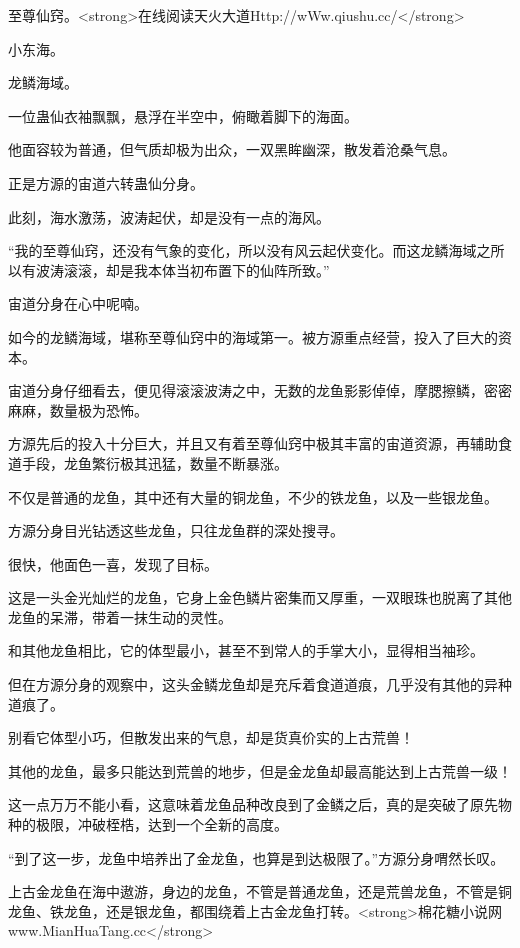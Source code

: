 
\begin{this_body}

至尊仙窍。<strong>在线阅读天火大道Http://wWw.qiushu.cc/</strong>

小东海。

龙鳞海域。

一位蛊仙衣袖飘飘，悬浮在半空中，俯瞰着脚下的海面。

他面容较为普通，但气质却极为出众，一双黑眸幽深，散发着沧桑气息。

正是方源的宙道六转蛊仙分身。

此刻，海水激荡，波涛起伏，却是没有一点的海风。

“我的至尊仙窍，还没有气象的变化，所以没有风云起伏变化。而这龙鳞海域之所以有波涛滚滚，却是我本体当初布置下的仙阵所致。”

宙道分身在心中呢喃。

如今的龙鳞海域，堪称至尊仙窍中的海域第一。被方源重点经营，投入了巨大的资本。

宙道分身仔细看去，便见得滚滚波涛之中，无数的龙鱼影影倬倬，摩腮擦鳞，密密麻麻，数量极为恐怖。

方源先后的投入十分巨大，并且又有着至尊仙窍中极其丰富的宙道资源，再辅助食道手段，龙鱼繁衍极其迅猛，数量不断暴涨。

不仅是普通的龙鱼，其中还有大量的铜龙鱼，不少的铁龙鱼，以及一些银龙鱼。

方源分身目光钻透这些龙鱼，只往龙鱼群的深处搜寻。

很快，他面色一喜，发现了目标。

这是一头金光灿烂的龙鱼，它身上金色鳞片密集而又厚重，一双眼珠也脱离了其他龙鱼的呆滞，带着一抹生动的灵性。

和其他龙鱼相比，它的体型最小，甚至不到常人的手掌大小，显得相当袖珍。

但在方源分身的观察中，这头金鳞龙鱼却是充斥着食道道痕，几乎没有其他的异种道痕了。

别看它体型小巧，但散发出来的气息，却是货真价实的上古荒兽！

其他的龙鱼，最多只能达到荒兽的地步，但是金龙鱼却最高能达到上古荒兽一级！

这一点万万不能小看，这意味着龙鱼品种改良到了金鳞之后，真的是突破了原先物种的极限，冲破桎梏，达到一个全新的高度。

“到了这一步，龙鱼中培养出了金龙鱼，也算是到达极限了。”方源分身喟然长叹。

上古金龙鱼在海中遨游，身边的龙鱼，不管是普通龙鱼，还是荒兽龙鱼，不管是铜龙鱼、铁龙鱼，还是银龙鱼，都围绕着上古金龙鱼打转。<strong>棉花糖小说网www.MianHuaTang.cc</strong>


\end{this_body}
